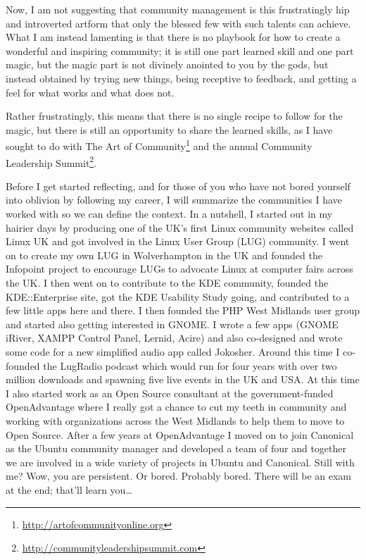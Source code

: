Now, I am not suggesting that community management is this frustratingly hip and
introverted artform that only the blessed few with such talents can achieve.
What I am instead lamenting is that there is no playbook for how to create a
wonderful and inspiring community; it is still one part learned skill and one
part magic, but the magic part is not divinely anointed to you by the gods, but
instead obtained by trying new things, being receptive to feedback, and getting
a feel for what works and what does not.

Rather frustratingly, this means that there is no single recipe to follow for
the magic, but there is still an opportunity to share the learned skills, as I
have sought to do with The Art of
Community\footnote{\url{http://artofcommunityonline.org}} and the annual
Community Leadership
Summit\footnote{\url{http://communityleadershipsummit.com}}.

Before I get started reflecting, and for those of you who have not bored
yourself into oblivion by following my career, I will summarize the communities
I have worked with so we can define the context. In a nutshell, I started out in
my hairier days by producing one of the UK’s first Linux community websites
called Linux UK and got involved in the Linux User Group (LUG) community. I went
on to create my own LUG in Wolverhampton in the UK and founded the Infopoint
project to encourage LUGs to advocate Linux at computer fairs across the UK. I
then went on to contribute to the KDE community, founded the KDE::Enterprise
site, got the KDE Usability Study going, and contributed to a few little apps
here and there. I then founded the PHP West Midlands user group and started also
getting interested in GNOME. I wrote a few apps (GNOME iRiver, XAMPP Control
Panel, Lernid, Acire) and also co-designed and wrote some code for a new
simplified audio app called Jokosher. Around this time I co-founded the LugRadio
podcast which would run for four years with over two million downloads and
spawning five live events in the UK and USA. At this time I also started work as
an Open Source consultant at the government-funded OpenAdvantage where I really
got a chance to cut my teeth in community and working with organizations across
the West Midlands to help them to move to Open Source. After a few years at
OpenAdvantage I moved on to join Canonical as the Ubuntu community manager and
developed a team of four and together we are involved in a wide variety of
projects in Ubuntu and Canonical.
\newline
Still with me?
\newline
Wow, you are persistent. Or bored. Probably bored. There will be an exam at the
end; that’ll learn you\dots

